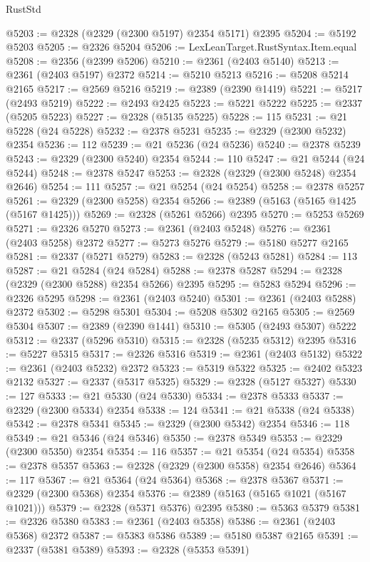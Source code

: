 \begin{lexlean}{RustStd}
\begin{coremodule}
{\begin{coremodule}
{{{{{{{{{{{{{{{{{{{{{{{{{{{{{{{{{{{{{@5203 := @2328 (@2329 (@2300 @5197) @2354 @5171) @2395
@5204 := @5192 @5203
@5205 := @2326 @5204
@5206 := LexLeanTarget.RustSyntax.Item.equal
@5208 := @2356 (@2399 @5206)
@5210 := @2361 (@2403 @5140)
@5213 := @2361 (@2403 @5197) @2372
@5214 := @5210 @5213
@5216 := @5208 @5214 @2165
@5217 := @2569 @5216
@5219 := @2389 (@2390 @1419)
@5221 := @5217 (@2493 @5219)
@5222 := @2493 @2425
@5223 := @5221 @5222
@5225 := @2337 (@5205 @5223)
@5227 := @2328 (@5135 @5225)
@5228 := 115
@5231 := @21 @5228 (@24 @5228)
@5232 := @2378 @5231
@5235 := @2329 (@2300 @5232) @2354
@5236 := 112
@5239 := @21 @5236 (@24 @5236)
@5240 := @2378 @5239
@5243 := @2329 (@2300 @5240) @2354
@5244 := 110
@5247 := @21 @5244 (@24 @5244)
@5248 := @2378 @5247
@5253 := @2328 (@2329 (@2300 @5248) @2354 @2646)
@5254 := 111
@5257 := @21 @5254 (@24 @5254)
@5258 := @2378 @5257
@5261 := @2329 (@2300 @5258) @2354
@5266 := @2389 (@5163 (@5165 @1425 (@5167 @1425)))
@5269 := @2328 (@5261 @5266) @2395
@5270 := @5253 @5269
@5271 := @2326 @5270
@5273 := @2361 (@2403 @5248)
@5276 := @2361 (@2403 @5258) @2372
@5277 := @5273 @5276
@5279 := @5180 @5277 @2165
@5281 := @2337 (@5271 @5279)
@5283 := @2328 (@5243 @5281)
@5284 := 113
@5287 := @21 @5284 (@24 @5284)
@5288 := @2378 @5287
@5294 := @2328 (@2329 (@2300 @5288) @2354 @5266) @2395
@5295 := @5283 @5294
@5296 := @2326 @5295
@5298 := @2361 (@2403 @5240)
@5301 := @2361 (@2403 @5288) @2372
@5302 := @5298 @5301
@5304 := @5208 @5302 @2165
@5305 := @2569 @5304
@5307 := @2389 (@2390 @1441)
@5310 := @5305 (@2493 @5307) @5222
@5312 := @2337 (@5296 @5310)
@5315 := @2328 (@5235 @5312) @2395
@5316 := @5227 @5315
@5317 := @2326 @5316
@5319 := @2361 (@2403 @5132)
@5322 := @2361 (@2403 @5232) @2372
@5323 := @5319 @5322
@5325 := @2402 @5323 @2132
@5327 := @2337 (@5317 @5325)
@5329 := @2328 (@5127 @5327)
@5330 := 127
@5333 := @21 @5330 (@24 @5330)
@5334 := @2378 @5333
@5337 := @2329 (@2300 @5334) @2354
@5338 := 124
@5341 := @21 @5338 (@24 @5338)
@5342 := @2378 @5341
@5345 := @2329 (@2300 @5342) @2354
@5346 := 118
@5349 := @21 @5346 (@24 @5346)
@5350 := @2378 @5349
@5353 := @2329 (@2300 @5350) @2354
@5354 := 116
@5357 := @21 @5354 (@24 @5354)
@5358 := @2378 @5357
@5363 := @2328 (@2329 (@2300 @5358) @2354 @2646)
@5364 := 117
@5367 := @21 @5364 (@24 @5364)
@5368 := @2378 @5367
@5371 := @2329 (@2300 @5368) @2354
@5376 := @2389 (@5163 (@5165 @1021 (@5167 @1021)))
@5379 := @2328 (@5371 @5376) @2395
@5380 := @5363 @5379
@5381 := @2326 @5380
@5383 := @2361 (@2403 @5358)
@5386 := @2361 (@2403 @5368) @2372
@5387 := @5383 @5386
@5389 := @5180 @5387 @2165
@5391 := @2337 (@5381 @5389)
@5393 := @2328 (@5353 @5391)
}}}}}}}}}}}}}}}}}}}}}}}}}}}}}}}}}}}}}
\end{coremodule}}
\end{coremodule}
\end{lexlean}
